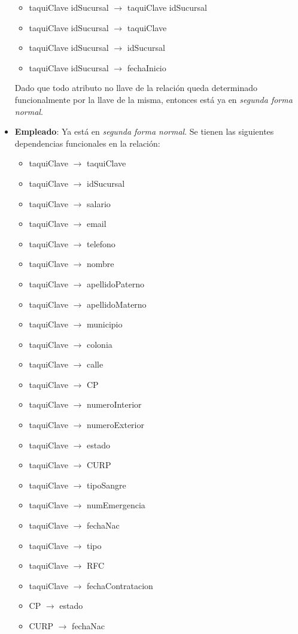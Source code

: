 \documentclass[11pt,letterpaper]{article}
\begin{document}
\begin{itemize}
\begin{itemize}
\item taquiClave idSucursal $\rightarrow$ taquiClave idSucursal

\item taquiClave idSucursal $\rightarrow$ taquiClave
\item taquiClave idSucursal $\rightarrow$ idSucursal
\item taquiClave idSucursal $\rightarrow$ fechaInicio
\end{itemize}

Dado que todo atributo no llave de la relación queda determinado funcionalmente por la llave de la misma, entonces está ya en \textit{segunda forma normal}.
\item \textbf{Empleado}: Ya está en \textit{segunda forma normal}. Se tienen las siguientes dependencias funcionales en la relación:

\begin{itemize}
\item taquiClave $\rightarrow$ taquiClave

\item taquiClave $\rightarrow$ idSucursal
\item taquiClave $\rightarrow$ salario 
\item taquiClave $\rightarrow$ email
\item taquiClave $\rightarrow$ telefono
\item taquiClave $\rightarrow$ nombre
\item taquiClave $\rightarrow$ apellidoPaterno
\item taquiClave $\rightarrow$ apellidoMaterno
\item taquiClave $\rightarrow$ municipio
\item taquiClave $\rightarrow$ colonia
\item taquiClave $\rightarrow$ calle 
\item taquiClave $\rightarrow$ CP
\item taquiClave $\rightarrow$ numeroInterior
\item taquiClave $\rightarrow$ numeroExterior
\item taquiClave $\rightarrow$ estado
\item taquiClave $\rightarrow$ CURP
\item taquiClave $\rightarrow$ tipoSangre
\item taquiClave $\rightarrow$ numEmergencia
\item taquiClave $\rightarrow$ fechaNac
\item taquiClave $\rightarrow$ tipo 
\item taquiClave $\rightarrow$ RFC
\item taquiClave $\rightarrow$ fechaContratacion
\item CP $\rightarrow$ estado
\item CURP $\rightarrow$ fechaNac
\end{itemize}


\end{itemize}
\end{document}
